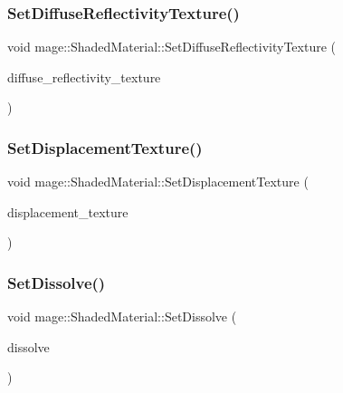 \subsubsection{\texorpdfstring{Set\+Diffuse\+Reflectivity\+Texture()}{SetDiffuseReflectivityTexture()}}
{\footnotesize\ttfamily void mage\+::\+Shaded\+Material\+::\+Set\+Diffuse\+Reflectivity\+Texture (\begin{DoxyParamCaption}\item[{\hyperlink{namespacemage_a1e01ae66713838a7a67d30e44c67703e}{Shared\+Ptr}$<$ \hyperlink{classmage_1_1_texture}{Texture} $>$}]{diffuse\+\_\+reflectivity\+\_\+texture }\end{DoxyParamCaption})}

\hypertarget{structmage_1_1_shaded_material_ab96c9ab7165ebb330790b15460b53c3b}{}\label{structmage_1_1_shaded_material_ab96c9ab7165ebb330790b15460b53c3b} 
\subsubsection{\texorpdfstring{Set\+Displacement\+Texture()}{SetDisplacementTexture()}}
{\footnotesize\ttfamily void mage\+::\+Shaded\+Material\+::\+Set\+Displacement\+Texture (\begin{DoxyParamCaption}\item[{\hyperlink{namespacemage_a1e01ae66713838a7a67d30e44c67703e}{Shared\+Ptr}$<$ \hyperlink{classmage_1_1_texture}{Texture} $>$}]{displacement\+\_\+texture }\end{DoxyParamCaption})}

\hypertarget{structmage_1_1_shaded_material_a403f3e4e673d31fffdb387f518393453}{}\label{structmage_1_1_shaded_material_a403f3e4e673d31fffdb387f518393453} 
\subsubsection{\texorpdfstring{Set\+Dissolve()}{SetDissolve()}}
{\footnotesize\ttfamily void mage\+::\+Shaded\+Material\+::\+Set\+Dissolve (\begin{DoxyParamCaption}\item[{float}]{dissolve }\end{DoxyParamCaption})\hspace{0.3cm}{\ttfamily [noexcept]}}

